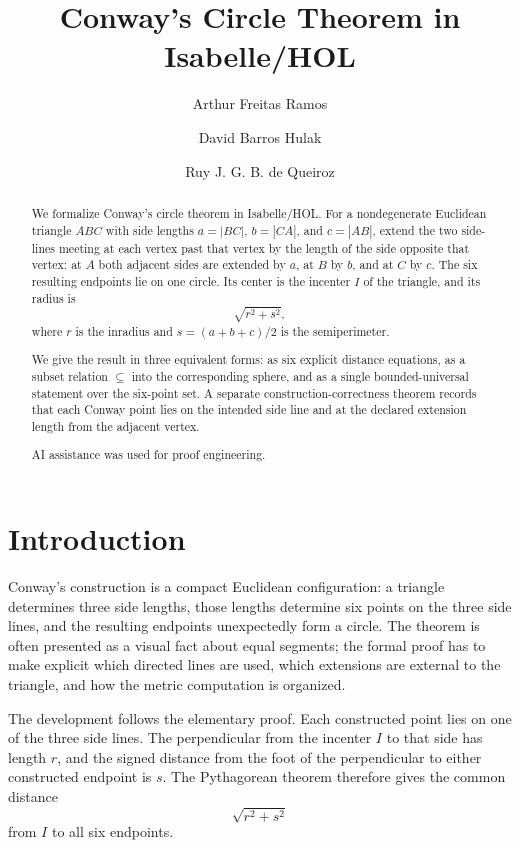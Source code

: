 \documentclass[11pt,a4paper]{article}
\begin{document}
\title{Conway's Circle Theorem in Isabelle/HOL}
\author{Arthur Freitas Ramos \and David Barros Hulak \and Ruy J. G. B. de Queiroz}
\maketitle

\begin{abstract}
We formalize Conway's circle theorem in Isabelle/HOL.  For a nondegenerate
Euclidean triangle \(ABC\) with side lengths \(a = |BC|\), \(b = |CA|\),
and \(c = |AB|\), extend the two side-lines meeting at each vertex past
that vertex by the length of the side opposite that vertex: at \(A\) both
adjacent sides are extended by \(a\), at \(B\) by \(b\), and at \(C\) by
\(c\).  The six resulting endpoints lie on one circle.  Its center is the
incenter \(I\) of the triangle, and its radius is
\[
  \sqrt{r^{2}+s^{2}},
\]
where \(r\) is the inradius and \(s = (a+b+c)/2\) is the semiperimeter.

We give the result in three equivalent forms: as six explicit distance
equations, as a subset relation \(\subseteq\) into the corresponding
\textsf{sphere}, and as a single bounded-universal statement over the
six-point set.  A separate construction-correctness theorem records that
each Conway point lies on the intended side line and at the declared
extension length from the adjacent vertex.

AI assistance was used for proof engineering. 
\end{abstract}

\tableofcontents

\newpage
\section{Introduction}

Conway's construction is a compact Euclidean configuration: a triangle
determines three side lengths, those lengths determine six points on the
three side lines, and the resulting endpoints unexpectedly form a circle.
The theorem is often presented as a visual fact about equal segments; the
formal proof has to make explicit which directed lines are used, which
extensions are external to the triangle, and how the metric computation is
organized.

The development follows the elementary proof.  Each constructed point lies
on one of the three side lines.  The perpendicular from the
incenter \(I\) to that side has length \(r\), and the signed distance from
the foot of the perpendicular to either constructed endpoint is \(s\).
The Pythagorean theorem therefore gives the common distance
\[
  \sqrt{r^{2}+s^{2}}
\]
from \(I\) to all six endpoints.
\end{document}
